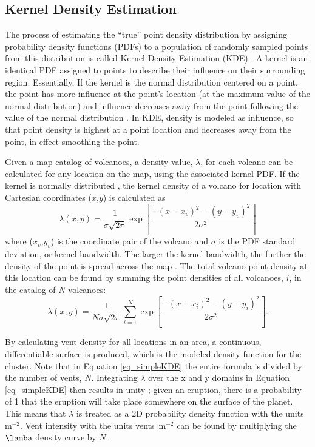 \subsection{Kernel Density Estimation}\label{sec_kde}
The process of estimating the ``true'' point density distribution by assigning probability density functions (PDFs) to a population of randomly sampled points from this distribution is called Kernel Density Estimation (KDE) \citep{silverman1986density}. A kernel is an identical PDF assigned to points to describe their influence on their surrounding region. Essentially, If the kernel is the normal distribution centered on a point, the point has more influence at the point's location (at the maximum value of the normal distribution) and influence decreases away from the point following the value of the normal distribution \citep{lutz1995improved}. In KDE, density is modeled as influence, so that point density is highest at a point location and decreases away from the point, in effect smoothing the point.

Given a map catalog of volcanoes, a density value, $\lambda$, for each volcano can be calculated for any location on the map, using the associated kernel PDF. If the kernel is normally distributed \citep{conway1998recurrence}, the kernel density of a volcano for location with Cartesian coordinates ($x$,$y$) is calculated as
\begin{equation}
\lambda(x,y) = \frac{1}{\sigma\sqrt{2\pi}}\exp\left[\frac{-(x-x_v)^2-(y-y_v)^2}{2\sigma^2}\right]
\end{equation}
where ($x_v$,$y_v$) is the coordinate pair of the volcano and $\sigma$ is the PDF standard deviation, or kernel bandwidth. The larger the kernel bandwidth, the further the density of the point is spread across the map \citep{lutz1995improved}. The total volcano point density at this location can be found by summing the point densities of all volcanoes, $i$, in the catalog of $N$ volcanoes:
\begin{equation}
\lambda(x,y) = \frac{1}{N\sigma\sqrt{2\pi}}\sum\limits_{i=1}^{N}\exp\left[\frac{-(x-x_i)^2-(y-y_i)^2}{2\sigma^2}\right].
\label{eq_simpleKDE}
\end{equation}

By calculating vent density for all locations in an area, a continuous, differentiable surface is produced, which is the modeled density function for the cluster. Note that in Equation \ref{eq_simpleKDE} the entire formula is divided by the number of vents, $N$. Integrating $\lambda$ over the x and y domains in Equation \ref{eq_simpleKDE} then results in unity \citep{connor2015probabilistic}; given an eruption, there is a probability of 1 that the eruption will take place somewhere on the surface of the planet. This means that $\lambda$ is treated as a 2D probability density function with the units m$^{-2}$. Vent intensity with the units vents~m$^{-2}$ can be found by multiplying the $\lamba$ density curve by $N$.

